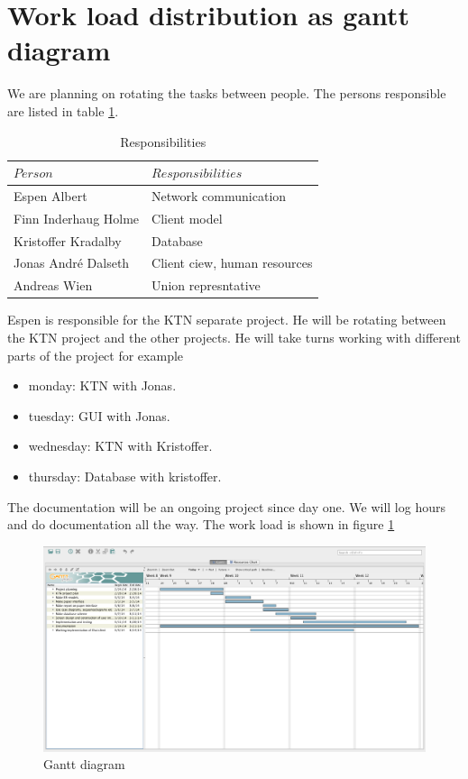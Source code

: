 \documentclass[a4paper, english, 12pt]{article}
\begin{document}
\section{Work load distribution as gantt diagram}
We are planning on rotating the tasks between people. The persons responsible are listed in table \ref{responsible}.
\begin{table}[h]
    \begin{center}
    \caption{Responsibilities} 
    \label{responsible}
    \vspace{0,5cm}
    \begin{tabular}{ll} \\ 
        \hline
        $Person$ & $Responsibilities$\\
        \hline 
        Espen Albert & Network communication\\
        Finn Inderhaug Holme & Client model\\
        Kristoffer Kradalby & Database \\
        Jonas André Dalseth & Client ciew, human resources \\
        Andreas Wien & Union represntative\\
        \hline
    \end{tabular}
    \end{center}
\end{table}
Espen is responsible for the KTN separate project. He will be rotating between the KTN project and the other projects. He will take turns working with different parts of the project for example

\begin{itemize}
\item monday: KTN with Jonas.
\item tuesday: GUI with Jonas. 
\item wednesday: KTN with Kristoffer. 
\item thursday: Database with kristoffer. 
\end{itemize}
The documentation will be an ongoing project since day one. We will log hours and do documentation all the way. The work load is shown in figure \ref{gantt}

\begin{figure}[h!] 
    \begin{center} 
    	\includegraphics[width=15cm]{GanttDiagram.png}
		\caption{Gantt diagram}
	\label{gantt}
	\end{center}
\end{figure}
\end{document}
